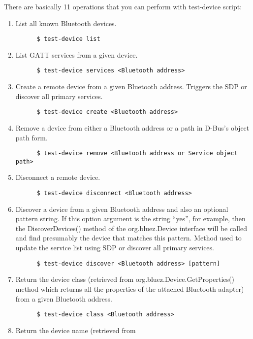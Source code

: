 \documentclass[11pt]{article}
\begin{document}
There are basically 11 operations that you can perform with test-device script:
\begin{enumerate}
  \item List all known Bluetooth devices.
    \begin{verbatim}
      $ test-device list
    \end{verbatim}
  \item List GATT services from a given device.
    \begin{verbatim}
      $ test-device services <Bluetooth address>
    \end{verbatim}
  \item Create a remote device from a given Bluetooth address. Triggers the
	  SDP or discover all primary services.
    \begin{verbatim}
      $ test-device create <Bluetooth address>
    \end{verbatim}
  \item Remove a device from either a Bluetooth address or a path in
        D-Bus's object path form.
    \begin{verbatim}
      $ test-device remove <Bluetooth address or Service object path>
    \end{verbatim}
  \item Disconnect a remote device.
    \begin{verbatim}
      $ test-device disconnect <Bluetooth address>
    \end{verbatim}
  \item Discover a device from a given Bluetooth address and also an
        optional pattern string. If this option argument is the string
        ``yes'', for example, then the DiscoverDevices() method of the
        org.bluez.Device interface will be called and find presumably
        the device that matches this pattern. Method used to update the
	service list using SDP or discover all primary services.
    \begin{verbatim}
      $ test-device discover <Bluetooth address> [pattern]
    \end{verbatim}
  \item Return the device class (retrieved from
        org.bluez.Device.GetProperties() method which returns all the
        properties of the attached Bluetooth adapter) from a given
        Bluetooth address.
    \begin{verbatim}
      $ test-device class <Bluetooth address>
    \end{verbatim}
  \item Return the device name (retrieved from

\end{enumerate}
\end{document}
